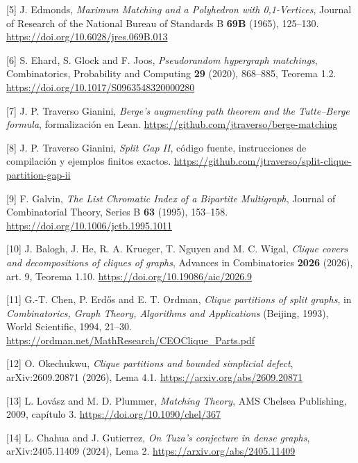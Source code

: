 \documentclass[spanish,11pt,a4paper]{article}
\begin{document}
{[}5{]} J. Edmonds, \emph{Maximum Matching and a Polyhedron with 0,1-Vertices}, Journal of Research of the National Bureau of Standards B \textbf{69B} (1965), 125--130. \url{https://doi.org/10.6028/jres.069B.013}

{[}6{]} S. Ehard, S. Glock and F. Joos, \emph{Pseudorandom hypergraph matchings}, Combinatorics, Probability and Computing \textbf{29} (2020), 868--885, Teorema 1.2. \url{https://doi.org/10.1017/S0963548320000280}

{[}7{]} J. P. Traverso Gianini, \emph{Berge's augmenting path theorem and the Tutte--Berge formula}, formalización en Lean. \url{https://github.com/jtraverso/berge-matching}

{[}8{]} J. P. Traverso Gianini, \emph{Split Gap II}, código fuente, instrucciones de compilación y ejemplos finitos exactos. \url{https://github.com/jtraverso/split-clique-partition-gap-ii}

{[}9{]} F. Galvin, \emph{The List Chromatic Index of a Bipartite Multigraph}, Journal of Combinatorial Theory, Series B \textbf{63} (1995), 153--158. \url{https://doi.org/10.1006/jctb.1995.1011}

{[}10{]} J. Balogh, J. He, R. A. Krueger, T. Nguyen and M. C. Wigal, \emph{Clique covers and decompositions of cliques of graphs}, Advances in Combinatorics \textbf{2026} (2026), art. 9, Teorema 1.10. \url{https://doi.org/10.19086/aic/2026.9}

{[}11{]} G.-T. Chen, P. Erdős and E. T. Ordman, \emph{Clique partitions of split graphs}, in \emph{Combinatorics, Graph Theory, Algorithms and Applications} (Beijing, 1993), World Scientific, 1994, 21--30. \url{https://ordman.net/MathResearch/CEOClique_Parts.pdf}

{[}12{]} O. Okechukwu, \emph{Clique partitions and bounded simplicial defect}, arXiv:2609.20871 (2026), Lema 4.1. \url{https://arxiv.org/abs/2609.20871}

{[}13{]} L. Lovász and M. D. Plummer, \emph{Matching Theory}, AMS Chelsea Publishing, 2009, capítulo 3. \url{https://doi.org/10.1090/chel/367}

{[}14{]} L. Chahua and J. Gutierrez, \emph{On Tuza's conjecture in dense graphs}, arXiv:2405.11409 (2024), Lema 2. \url{https://arxiv.org/abs/2405.11409}
\end{document}

